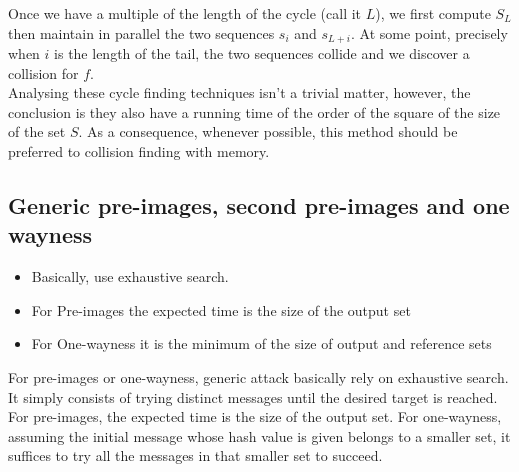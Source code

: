 		Once we have a multiple of the length of the cycle (call it $L$), we first compute $S_L$ then maintain in parallel the two sequences $s_i$ and $s_{L+i}$. 
		At some point, precisely when $i$ is the length of the tail, the two sequences collide and we discover a collision for $f$.\\
		Analysing these cycle finding techniques isn’t a trivial matter, however, the conclusion is they also have a running time of the order of the square of the size of the set $S$. 
		As a consequence, whenever possible, this method should be preferred to collision finding with memory.
	
	\subsection{Generic pre-images, second pre-images and one wayness}
		\begin{itemize}
			\item Basically, use exhaustive search.
			\item For Pre-images the expected time is the size of the output set
			\item For One-wayness it is the minimum of the size of output and reference sets
		\end{itemize}
		For pre-images or one-wayness, generic attack basically rely on exhaustive search. 
		It simply consists of trying distinct messages until the desired target is reached. 
		For pre-images, the expected time is the size of the output set. 
		For one-wayness, assuming the initial message whose hash value is given belongs to a smaller set, it suffices to try all the messages in that smaller set to succeed.
	
